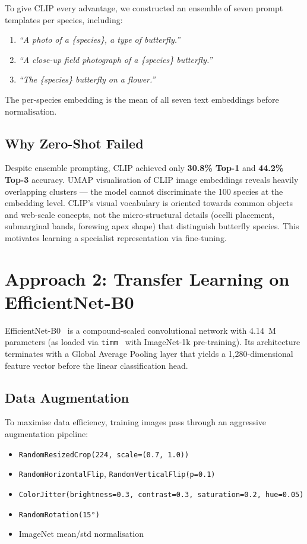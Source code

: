 \documentclass[journal, twocolumn]{IEEEtran}
\begin{document}
To give CLIP every advantage, we constructed an ensemble of seven prompt templates per species, including:
\begin{enumerate}
    \item \textit{``A photo of a \{species\}, a type of butterfly.''}
    \item \textit{``A close-up field photograph of a \{species\} butterfly.''}
    \item \textit{``The \{species\} butterfly on a flower.''}
\end{enumerate}

The per-species embedding is the mean of all seven text embeddings before normalisation.

\subsection{Why Zero-Shot Failed}

Despite ensemble prompting, CLIP achieved only \textbf{30.8\% Top-1} and \textbf{44.2\% Top-3} accuracy. UMAP visualisation of CLIP image embeddings reveals heavily overlapping clusters — the model cannot discriminate the 100 species at the embedding level. CLIP's visual vocabulary is oriented towards common objects and web-scale concepts, not the micro-structural details (ocelli placement, submarginal bands, forewing apex shape) that distinguish butterfly species. This motivates learning a specialist representation via fine-tuning.

\section{Approach 2: Transfer Learning on EfficientNet-B0}

EfficientNet-B0~\cite{tan2019efficientnet} is a compound-scaled convolutional network with 4.14~M parameters (as loaded via \texttt{timm}~\cite{rw2019timm} with ImageNet-1k pre-training). Its architecture terminates with a Global Average Pooling layer that yields a 1,280-dimensional feature vector before the linear classification head.

\subsection{Data Augmentation}

To maximise data efficiency, training images pass through an aggressive augmentation pipeline:
\begin{itemize}
    \item \texttt{RandomResizedCrop(224, scale=(0.7, 1.0))}
    \item \texttt{RandomHorizontalFlip}, \texttt{RandomVerticalFlip(p=0.1)}
    \item \texttt{ColorJitter(brightness=0.3, contrast=0.3, saturation=0.2, hue=0.05)}
    \item \texttt{RandomRotation(15°)}
    \item ImageNet mean/std normalisation
\end{itemize}
\end{document}
